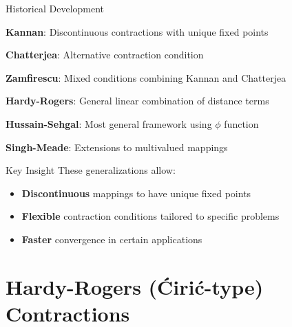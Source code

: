 \documentclass[aspectratio=169,10pt]{beamer}
\begin{document}
\begin{frame}{Historical Development}
    \begin{description}[1970]
        \item[1968] \textbf{Kannan}: Discontinuous contractions with unique fixed points
        \item[1972] \textbf{Chatterjea}: Alternative contraction condition
        \item[1972] \textbf{Zamfirescu}: Mixed conditions combining Kannan and Chatterjea
        \item[1973] \textbf{Hardy-Rogers}: General linear combination of distance terms
        \item[1975] \textbf{Hussain-Sehgal}: Most general framework using $\phi$ function
        \item[1977] \textbf{Singh-Meade}: Extensions to multivalued mappings
    \end{description}

    \vspace{0.5cm}
    \begin{block}{Key Insight}
        These generalizations allow:
        \begin{itemize}
            \item \textbf{Discontinuous} mappings to have unique fixed points
            \item \textbf{Flexible} contraction conditions tailored to specific problems
            \item \textbf{Faster} convergence in certain applications
        \end{itemize}
    \end{block}
\end{frame}

\section{Hardy-Rogers (Ćirić-type) Contractions}
\end{document}
